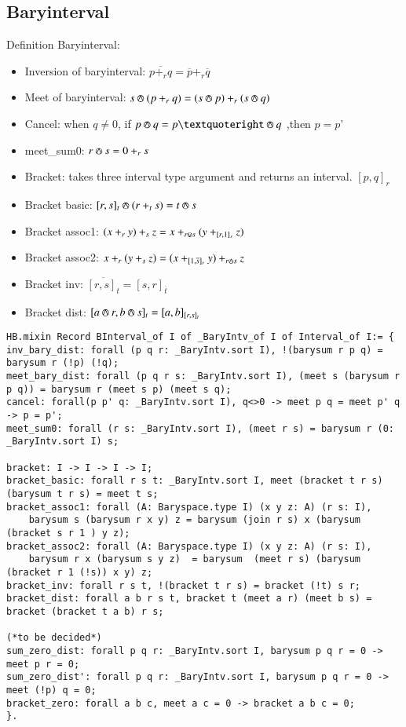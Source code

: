 \documentclass[a4paper,10pt]{article} %
\newcommand{\meet}{\circledwedge}
\newcommand{\join}{\circledvee}
\begin{document}
\subsection{Baryinterval}
Definition Baryinterval:
\begin{itemize}
    \item Inversion of baryinterval: $\overline{p +_rq} = \overline{p} + _r\overline{q}$
    \item Meet of baryinterval: $s \meet (p +_rq) = (s \meet p) + _r(s \meet q)$
    \item Cancel: when $q \neq 0$, if $p \meet q = p’ \meet q$ ,then $p = p’$
    \item meet\_sum0: $r \meet s = 0 + _rs$
    \item Bracket: takes three interval type argument and returns an interval. $[p, q]_r$
    \item Bracket basic: $[r, s]_t \meet (r + _ts) = t \meet s$
    \item Bracket assoc1: $(x +_ry) + _sz = x + _{r \join s}(y + _{[r, 1]_s}z)$
    \item Bracket assoc2: $x + _r(y + _sz) = (x + _{[1, \overline{s}]_r}y)+ _{r \meet s}z$
    \item Bracket inv: $\overline{[r, s]_t} = [s, r]_{\overline{t}}$
    \item Bracket dist: $[a \meet r, b \meet s]_t = [a, b]_{[r, s]_t}$
\end{itemize}
\begin{lstlisting}
HB.mixin Record BInterval_of I of _BaryIntv_of I of Interval_of I:= {
inv_bary_dist: forall (p q r: _BaryIntv.sort I), !(barysum r p q) = barysum r (!p) (!q);
meet_bary_dist: forall (p q r s: _BaryIntv.sort I), (meet s (barysum r p q)) = barysum r (meet s p) (meet s q);
cancel: forall(p p' q: _BaryIntv.sort I), q<>0 -> meet p q = meet p' q -> p = p';
meet_sum0: forall (r s: _BaryIntv.sort I), (meet r s) = barysum r (0: _BaryIntv.sort I) s;

bracket: I -> I -> I -> I;
bracket_basic: forall r s t: _BaryIntv.sort I, meet (bracket t r s) (barysum t r s) = meet t s;
bracket_assoc1: forall (A: Baryspace.type I) (x y z: A) (r s: I),
    barysum s (barysum r x y) z = barysum (join r s) x (barysum (bracket s r 1 ) y z);
bracket_assoc2: forall (A: Baryspace.type I) (x y z: A) (r s: I),
    barysum r x (barysum s y z)  = barysum  (meet r s) (barysum (bracket r 1 (!s)) x y) z;
bracket_inv: forall r s t, !(bracket t r s) = bracket (!t) s r;
bracket_dist: forall a b r s t, bracket t (meet a r) (meet b s) = bracket (bracket t a b) r s;

(*to be decided*)
sum_zero_dist: forall p q r: _BaryIntv.sort I, barysum p q r = 0 -> meet p r = 0;
sum_zero_dist': forall p q r: _BaryIntv.sort I, barysum p q r = 0 -> meet (!p) q = 0;
bracket_zero: forall a b c, meet a c = 0 -> bracket a b c = 0;
}.
\end{lstlisting}
\end{document}

